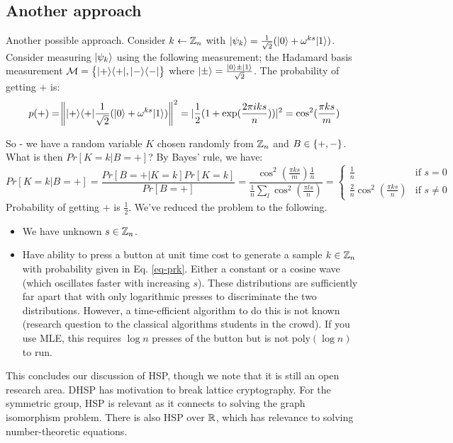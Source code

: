 \subsection*{Another approach}
Another possible approach. Consider $k \leftarrow \mathbb{Z}_n$ with $\lvert \psi_k \rangle = \frac{1}{\sqrt{2}}(\lvert 0 \rangle + \omega^{ks}\lvert 1 \rangle)$. Consider measuring $\lvert \psi_k \rangle$ using the following measurement; the Hadamard basis measurement $\mathcal{M} = \set{\lvert + \rangle \langle + \rvert, \lvert - \rangle \langle - \rvert}$ where $\lvert \pm \rangle = \frac{\lvert 0 \rangle \pm \lvert 1 \rangle}{\sqrt{2}}$. The probability of getting $+$ is:
\begin{equation}
    p(+) = \norm{\lvert + \rangle \langle + \rvert\frac{1}{\sqrt{2}}(\lvert 0 \rangle + \omega^{ks}\lvert 1 \rangle)}^2 = \lvert \frac{1}{2}(1 + \exp(\frac{2\pi i ks}{n})) \rvert^2 = \cos^2(\frac{\pi k s}{m})
\end{equation}

So - we have a random variable $K$ chosen randomly from $\mathbb{Z}_n$ and $B \in \set{+, -}$. What is then $Pr[K = k \vert B = +]$? By Bayes' rule, we have:
\begin{equation}\label{eq-prk}
    Pr[K = k \vert B = +] = \frac{Pr[B = +\vert K = k]Pr[K = k]}{Pr[B = +]} = \frac{\cos^2(\frac{\pi k s}{m})\frac{1}{n}}{\frac{1}{n}\sum_l\cos^2(\frac{\pi l s}{n}) } = \begin{cases}
        \frac{1}{n} & \text{if $s = 0$}
        \\ \frac{2}{n}\cos^2(\frac{\pi k s}{n}) & \text{if $s \neq 0$}
    \end{cases}
\end{equation}
Probability of getting $+$ is $\frac{1}{2}$. We've reduced the problem to the following.
\begin{itemize}
    \item We have unknown $s \in \mathbb{Z}_n$.
    \item Have ability to press a button at unit time cost to generate a sample $k \in \mathbb{Z}_n$ with probability given in Eq. \eqref{eq-prk}. Either a constant or a cosine wave (which oscillates faster with increasing $s$). These distributions are sufficiently far apart that with only logarithmic presses to discriminate the two distributions. However, a time-efficient algorithm to do this is not known (research question to the classical algorithms students in the crowd). If you use MLE, this requires $\log n$ presses of the button but is not $\text{poly}(\log n)$ to run.
\end{itemize}

This concludes our discussion of HSP, though we note that it is still an open research area. DHSP has motivation to break lattice cryptography. For the symmetric group, HSP is relevant as it connects to solving the graph isomorphism problem. There is also HSP over $\mathbb{R}$, which has relevance to solving number-theoretic equations.

